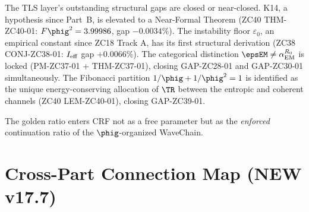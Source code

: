 \documentclass[12pt, a4paper]{article}
\begin{document}
\begin{keybox}[title={Part XXIX Summary}]
The TLS layer's outstanding structural gaps are closed or
near-closed. K14, a hypothesis since Part~B, is elevated to a
Near-Formal Theorem (ZC40 THM-ZC40-01: $F\phig^2 = 3.99986$, gap
$-0.0034\%$). The instability floor $\varepsilon_0$, an empirical
constant since ZC18 Track A, has its first structural derivation
(ZC38 CONJ-ZC38-01: $I_{\rm eff}$ gap $+0.0066\%$). The categorical
distinction $\epsEM \neq \alpha_{\rm EM}^{R_0}$ is locked
(PM-ZC37-01 + THM-ZC37-01), closing GAP-ZC28-01 and GAP-ZC30-01
simultaneously. The Fibonacci partition $1/\phig + 1/\phig^2 = 1$
is identified as the unique energy-conserving allocation of $\TR$
between the entropic and coherent channels (ZC40 LEM-ZC40-01),
closing GAP-ZC39-01.

The golden ratio enters CRF not as a free parameter but as the
\emph{enforced} continuation ratio of the $\phig$-organized
WaveChain.
\end{keybox}

\newpage

\part{Cross-Part Connection Map (NEW v17.7)}
\label{part:XXX}
\end{document}
